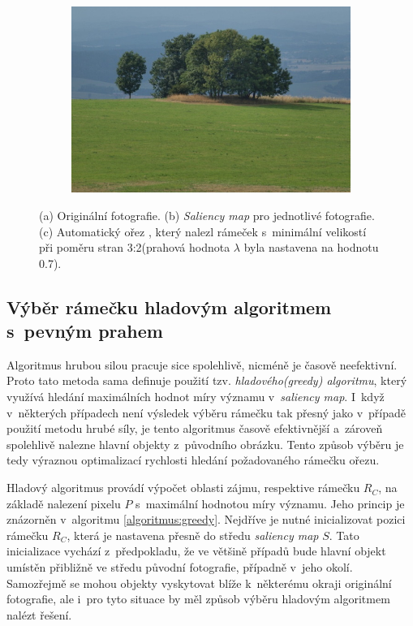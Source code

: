 \begin{figure}[H]
\begin{subfigure}{.32\textwidth}
      \includegraphics[scale=1.0]{obrazky/cropSuh35.jpg}
      \caption{}
    \end{subfigure}
    \vspace{1pt}
    
\caption{(a) Originální fotografie. (b) \emph{Saliency map} \cite{Itti1998} pro jednotlivé fotografie. (c) Automatický ořez \cite{Suh2003}, který nalezl rámeček s~minimální velikostí při poměru stran 3:2(prahová hodnota $\lambda$ byla nastavena na hodnotu 0.7).}
\label{obr:suhCrop}
\end{figure}

\subsection{Výběr rámečku hladovým algoritmem s~pevným prahem}
Algoritmus hrubou silou pracuje sice spolehlivě, nicméně je časově neefektivní. Proto tato metoda sama definuje použití tzv. \emph{hladového(greedy) algoritmu}, který využívá hledání maximálních hodnot míry významu v~\emph{saliency map}. I~když v~některých případech není výsledek výběru rámečku tak přesný jako v~případě použití metodu hrubé síly, je tento algoritmus časově efektivnější a~zároveň spolehlivě nalezne hlavní objekty z~původního obrázku. Tento způsob výběru je tedy výraznou optimalizací rychlosti hledání požadovaného rámečku ořezu.

Hladový algoritmus provádí výpočet oblasti zájmu, respektive rámečku $R_C$, na základě nalezení pixelu $P$ s~maximální hodnotou míry významu. Jeho princip je znázorněn v~algoritmu \ref{algoritmus:greedy}. Nejdříve je nutné inicializovat pozici rámečku $R_C$, která je nastavena přesně do středu \emph{saliency map} $S$. Tato inicializace vychází z~předpokladu, že ve většině případů bude hlavní objekt umístěn přibližně ve středu původní fotografie, případně v~jeho okolí. Samozřejmě se mohou objekty vyskytovat blíže k~některému okraji originální fotografie, ale i~pro tyto situace by měl způsob výběru hladovým algoritmem nalézt řešení.


